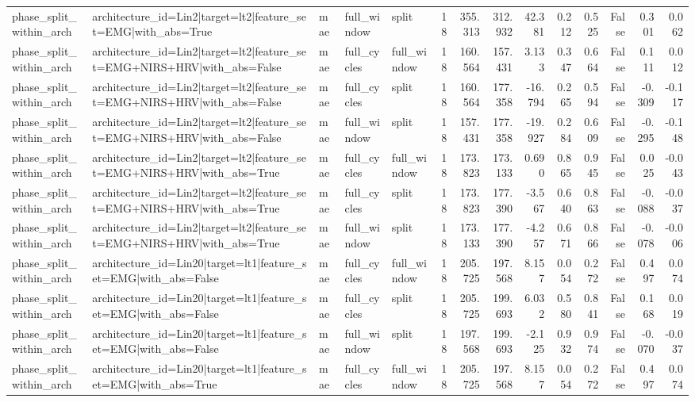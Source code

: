 \begin{table}
\begin{tabular}{lllllrrrrrrrrr}
phase_split_within_arch & architecture_id=Lin2|target=lt2|feature_set=EMG|with_abs=True & mae & full_window & split & 18 & 355.313 & 312.932 & 42.381 & 0.212 & 0.525 & False & 0.301 & 0.062 \\
phase_split_within_arch & architecture_id=Lin2|target=lt2|feature_set=EMG+NIRS+HRV|with_abs=False & mae & full_cycles & full_window & 18 & 160.564 & 157.431 & 3.133 & 0.347 & 0.664 & False & 0.111 & 0.012 \\
phase_split_within_arch & architecture_id=Lin2|target=lt2|feature_set=EMG+NIRS+HRV|with_abs=False & mae & full_cycles & split & 18 & 160.564 & 177.358 & -16.794 & 0.265 & 0.594 & False & -0.309 & -0.117 \\
phase_split_within_arch & architecture_id=Lin2|target=lt2|feature_set=EMG+NIRS+HRV|with_abs=False & mae & full_window & split & 18 & 157.431 & 177.358 & -19.927 & 0.284 & 0.609 & False & -0.295 & -0.148 \\
phase_split_within_arch & architecture_id=Lin2|target=lt2|feature_set=EMG+NIRS+HRV|with_abs=True & mae & full_cycles & full_window & 18 & 173.823 & 173.133 & 0.690 & 0.865 & 0.945 & False & 0.025 & -0.043 \\
phase_split_within_arch & architecture_id=Lin2|target=lt2|feature_set=EMG+NIRS+HRV|with_abs=True & mae & full_cycles & split & 18 & 173.823 & 177.390 & -3.567 & 0.640 & 0.863 & False & -0.088 & -0.037 \\
phase_split_within_arch & architecture_id=Lin2|target=lt2|feature_set=EMG+NIRS+HRV|with_abs=True & mae & full_window & split & 18 & 173.133 & 177.390 & -4.257 & 0.671 & 0.866 & False & -0.078 & -0.006 \\
phase_split_within_arch & architecture_id=Lin20|target=lt1|feature_set=EMG|with_abs=False & mae & full_cycles & full_window & 18 & 205.725 & 197.568 & 8.157 & 0.054 & 0.272 & False & 0.497 & 0.074 \\
phase_split_within_arch & architecture_id=Lin20|target=lt1|feature_set=EMG|with_abs=False & mae & full_cycles & split & 18 & 205.725 & 199.693 & 6.032 & 0.580 & 0.841 & False & 0.168 & 0.019 \\
phase_split_within_arch & architecture_id=Lin20|target=lt1|feature_set=EMG|with_abs=False & mae & full_window & split & 18 & 197.568 & 199.693 & -2.125 & 0.932 & 0.974 & False & -0.070 & -0.037 \\
phase_split_within_arch & architecture_id=Lin20|target=lt1|feature_set=EMG|with_abs=True & mae & full_cycles & full_window & 18 & 205.725 & 197.568 & 8.157 & 0.054 & 0.272 & False & 0.497 & 0.074 \\

\end{tabular}
\end{table}
